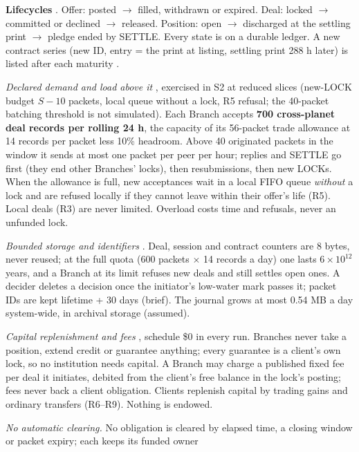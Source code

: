 \textbf{Lifecycles} \implemented. Offer: posted $\to$ filled, withdrawn or expired. Deal: locked $\to$ committed or declined $\to$ released.
Position: open $\to$ discharged at the settling print $\to$ pledge ended by SETTLE. Every state is on a durable ledger. A new contract series
(new ID, entry = the print at listing, settling print 288 h later) is listed after each maturity \extension.

\begin{description}[leftmargin=2.2em,style=sameline]
\item[R18] \emph{Declared demand and load above it} \implemented, exercised in S2 at reduced slices (new-LOCK budget $S-10$ packets, local queue
without a lock, R5 refusal; the 40-packet batching threshold is not simulated). Each Branch accepts \textbf{700 cross-planet deal records per
rolling 24 h}, the capacity of its 56-packet trade allowance at 14 records per packet less 10\% headroom. Above 40 originated packets in the window it
sends at most one packet per peer per hour; replies and SETTLE go first (they end other Branches' locks), then resubmissions, then new LOCKs. When the
allowance is full, new acceptances wait in a local FIFO queue \emph{without} a lock and are refused locally if they cannot leave within their offer's
life (R5). Local deals (R3) are never limited. Overload costs time and refusals, never an unfunded lock.
\item[R19] \emph{Bounded storage and identifiers} \implemented. Deal, session and contract counters are 8 bytes, never reused; at the full quota
(600 packets $\times$ 14 records a day) one lasts $6 \times 10^{12}$ years, and a Branch at its limit refuses new deals and still settles open ones. A
decider deletes a decision once the initiator's low-water mark passes it; packet IDs are kept lifetime + 30 days (brief). The journal grows at most
0.54 MB a day system-wide, in archival storage (assumed).
\item[R20] \emph{Capital replenishment and fees} \implemented, schedule \$0 in every run. Branches never take a position, extend credit or guarantee
anything; every guarantee is a client's own lock, so no institution needs capital. A Branch may charge a published fixed fee per deal it initiates,
debited from the client's free balance in the lock's posting; fees never back a client obligation. Clients replenish capital by trading gains and
ordinary transfers (R6--R9). Nothing is endowed.
\item[R21] \emph{No automatic clearing.} No obligation is cleared by elapsed time, a closing window or packet expiry; each keeps its funded owner

\end{description}
